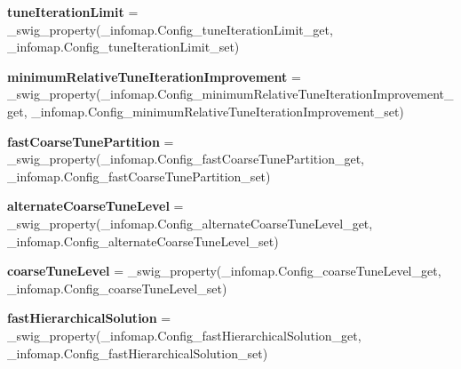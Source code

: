\begin{DoxyCompactItemize}
{\bfseries tune\+Iteration\+Limit} = \+\_\+swig\+\_\+property(\+\_\+infomap.\+Config\+\_\+tune\+Iteration\+Limit\+\_\+get, \+\_\+infomap.\+Config\+\_\+tune\+Iteration\+Limit\+\_\+set)
\item 
\mbox{\label{classdsmacc_1_1graph_1_1infomap_1_1Config_a82d6e167fedc4a7eafa6e0cc9f94970c}} 
{\bfseries minimum\+Relative\+Tune\+Iteration\+Improvement} = \+\_\+swig\+\_\+property(\+\_\+infomap.\+Config\+\_\+minimum\+Relative\+Tune\+Iteration\+Improvement\+\_\+get, \+\_\+infomap.\+Config\+\_\+minimum\+Relative\+Tune\+Iteration\+Improvement\+\_\+set)
\item 
\mbox{\label{classdsmacc_1_1graph_1_1infomap_1_1Config_a1dab6df73075a0bedaff507f4676d2fa}} 
{\bfseries fast\+Coarse\+Tune\+Partition} = \+\_\+swig\+\_\+property(\+\_\+infomap.\+Config\+\_\+fast\+Coarse\+Tune\+Partition\+\_\+get, \+\_\+infomap.\+Config\+\_\+fast\+Coarse\+Tune\+Partition\+\_\+set)
\item 
\mbox{\label{classdsmacc_1_1graph_1_1infomap_1_1Config_afd05c945efb164bc7933f85eb40b584c}} 
{\bfseries alternate\+Coarse\+Tune\+Level} = \+\_\+swig\+\_\+property(\+\_\+infomap.\+Config\+\_\+alternate\+Coarse\+Tune\+Level\+\_\+get, \+\_\+infomap.\+Config\+\_\+alternate\+Coarse\+Tune\+Level\+\_\+set)
\item 
\mbox{\label{classdsmacc_1_1graph_1_1infomap_1_1Config_ac22d8522ee2f17d162f20abeff67613e}} 
{\bfseries coarse\+Tune\+Level} = \+\_\+swig\+\_\+property(\+\_\+infomap.\+Config\+\_\+coarse\+Tune\+Level\+\_\+get, \+\_\+infomap.\+Config\+\_\+coarse\+Tune\+Level\+\_\+set)
\item 
\mbox{\label{classdsmacc_1_1graph_1_1infomap_1_1Config_a2aa9b185a21a63e464f313b77a689bf0}} 
{\bfseries fast\+Hierarchical\+Solution} = \+\_\+swig\+\_\+property(\+\_\+infomap.\+Config\+\_\+fast\+Hierarchical\+Solution\+\_\+get, \+\_\+infomap.\+Config\+\_\+fast\+Hierarchical\+Solution\+\_\+set)
\item 
\mbox{\label{classdsmacc_1_1graph_1_1infomap_1_1Config_a85ee4f277a7fb56ff55ab6e0b312dcda}} 

\end{DoxyCompactItemize}
